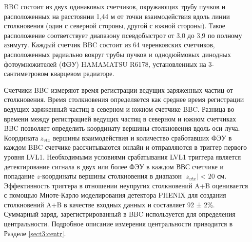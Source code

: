 BBC состоит из двух одинаковых счетчиков, окружающих трубу пучков и расположенных на расстоянии 1,44 м от точки взаимодействия вдоль линии столкновения (один с северной стороны, другой с южной стороны). Такое расположение соответствует диапазону псевдобыстрот от 3,0 до 3,9 по полному азимуту. Каждый счетчик BBC состоит из 64 черенковских счетчиков, расположенных радиально вокруг трубы пучков и однодюймовых динодных фотоумножителей (ФЭУ) HAMAMATSU R6178, установленных на 3-сантиметровом кварцевом радиаторе.

Счетчики BBC измеряют время регистрации ведущих заряженных частиц от столкновения. Время столкновения определяется как среднее время регистрации ведущих заряженный частиц в северном и южном счетчике BBC. 
Разница во времени между регистрацией ведущих частиц в северном и южном счетчиках BBC позволяет определить координату вершины столкновения вдоль оси луча. Координата $z_{vtx}$ вершины взаимодействия и количество сработавших ФЭУ в каждом BBC счетчике рассчитываются онлайн и отправляются в триггер первого уровня LVL1. Необходимыми условиями срабатывания LVL1 триггера является детектирование сигнала в двух или более ФЭУ в каждом ВВС счетчике и попадание $z$-координаты вершины столкновения в диапазон $|z_{vtx}|$ < 20 см.  Эффективность триггера в отношении неупругих столкновений A+B оценивается с помощью Мноте-Карло моделирования детектора PHENIX для создания столкновений A+B в качестве входных данных и составляет 92 ± 2\%. Суммарный заряд, зарегистрированный в BBC используется для определения центральности. Подробное описание измерения центральности приводится в Разделе \ref{sect3:centr}.

